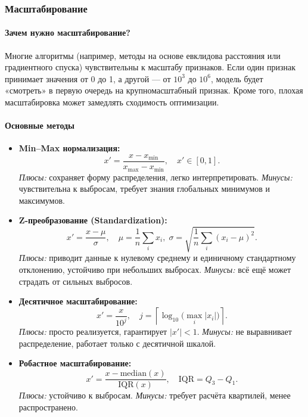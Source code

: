 \subsubsection{Масштабирование}
\label{sec:scaling}

\paragraph{Зачем нужно масштабирование?}  
Многие алгоритмы (например, методы на основе евклидова расстояния или градиентного спуска) чувствительны к масштабу признаков. Если один признак принимает значения от 0 до 1, а другой — от \(10^3\) до \(10^6\), модель будет «смотреть» в первую очередь на крупномасштабный признак. Кроме того, плохая масштабировка может замедлять сходимость оптимизации.

\paragraph{Основные методы}
\begin{itemize}
  \item \textbf{Min–Max нормализация:}  
    \[
      x' = \frac{x - x_{\min}}{x_{\max} - x_{\min}},
      \quad x'\in[0,1].
    \]
    \emph{Плюсы:} сохраняет форму распределения, легко интерпретировать.  
    \emph{Минусы:} чувствительна к выбросам, требует знания глобальных минимумов и максимумов.
    
  \item \textbf{Z-преобразование (Standardization):}  
    \[
      x' = \frac{x - \mu}{\sigma},
      \quad \mu = \frac{1}{n}\sum_i x_i,\;
      \sigma = \sqrt{\frac{1}{n}\sum_i (x_i - \mu)^2}.
    \]
    \emph{Плюсы:} приводит данные к нулевому среднему и единичному стандартному отклонению, устойчиво при небольших выбросах.  
    \emph{Минусы:} всё ещё может страдать от сильных выбросов.
    
  \item \textbf{Десятичное масштабирование:}  
    \[
      x' = \frac{x}{10^j},\quad
      j = \left\lceil \log_{10}\bigl(\max_i |x_i|\bigr)\right\rceil.
    \]
    \emph{Плюсы:} просто реализуется, гарантирует \(|x'|<1\).  
    \emph{Минусы:} не выравнивает распределение, работает только с десятичной шкалой.
    
  \item \textbf{Робастное масштабирование:}  
    \[
      x' = \frac{x - \mathrm{median}(x)}{\mathrm{IQR}(x)},
      \quad \mathrm{IQR} = Q_3 - Q_1.
    \]
    \emph{Плюсы:} устойчиво к выбросам.  
    \emph{Минусы:} требует расчёта квартилей, менее распространено.
\end{itemize}

